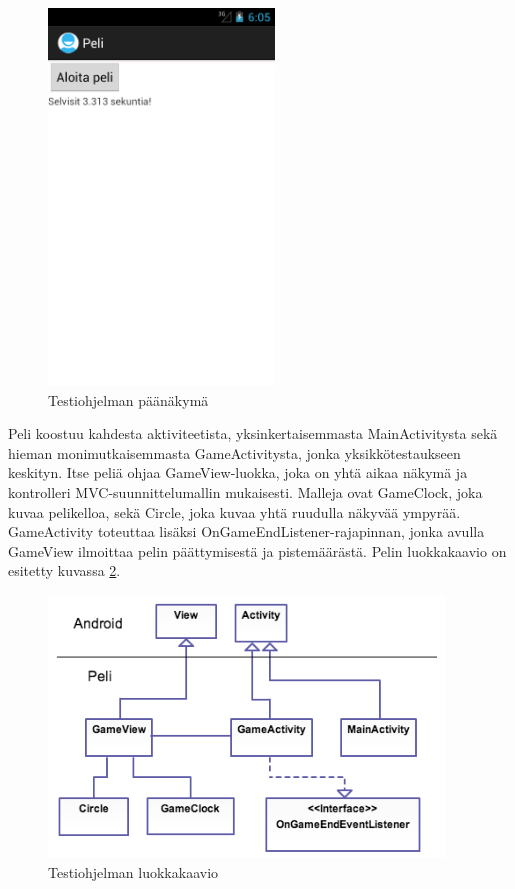 \begin{figure}[h]
\centering
\includegraphics[width=60mm]{peli_mainactivity.png}
\caption{Testiohjelman päänäkymä} \label{mainactivity}
\end{figure}

Peli koostuu kahdesta aktiviteetista, yksinkertaisemmasta MainActivitysta sekä hieman monimutkaisemmasta GameActivitysta, jonka yksikkötestaukseen keskityn. Itse peliä ohjaa GameView-luokka, joka on yhtä aikaa näkymä ja kontrolleri MVC-suunnittelumallin mukaisesti. Malleja ovat GameClock, joka kuvaa pelikelloa, sekä Circle, joka kuvaa yhtä ruudulla näkyvää ympyrää. GameActivity toteuttaa lisäksi OnGameEndListener-rajapinnan, jonka avulla GameView ilmoittaa pelin päättymisestä ja pistemäärästä. Pelin luokkakaavio on esitetty kuvassa \ref{game_classdiagram}.

\begin{figure}[h]
\centering
\includegraphics[width=105mm]{peli_luokkakaavio.png}
\caption{Testiohjelman luokkakaavio} \label{game_classdiagram}
\end{figure}

